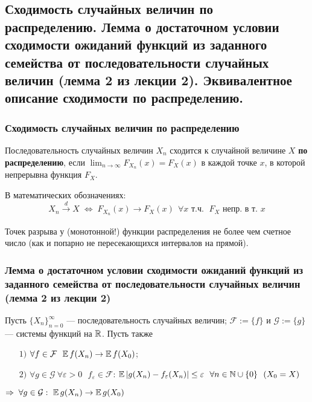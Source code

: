 \subsection{Сходимость случайных величин по распределению. Лемма о достаточном условии сходимости ожиданий функций из заданного семейства от последовательности случайных величин (лемма 2 из лекции 2). Эквивалентное описание сходимости по распределению.}

\subsubsection{Сходимость случайных величин по распределению}
\begin{definition*} Последовательность случайных величин $X_n$ сходится к случайной величине $X$ \textbf{по распределению}, если $\lim_{n \to \infty} F_{X_n}(x) = F_X(x)$ в каждой точке $x$, в которой непрерывна функция $F_X$. \end{definition*}
В математических обозначениях:
\[ X_n \xrightarrow[]{d} X \;\Leftrightarrow\; F_{X_n}(x) \to F_X(x) \ \ \forall x \text{ т.ч. } \; F_X \text{ непр. в т. } x \]

Точек разрыва у (монотонной!) функции распределения не более чем счетное число (как и попарно не пересекающихся интервалов на прямой).

\subsubsection{Лемма о достаточном условии сходимости ожиданий функций из заданного семейства от последовательности случайных величин (лемма 2 из лекции 2)}

\begin{lemma*}
    Пусть $\{X_n\}_{n=0}^{\infty}$ --- последовательность случайных величин; $\mathcal{F} := \{f\}$ и $\mathcal{G} := \{g\}$ --- системы функций на $\mathbb{R}$. Пусть также
    \begin{enumerate}
        \item[$1)$] $\forall f \in \mathcal{F} \ \ \mathbb{E}\,f(X_n) \to \mathbb{E}\,f(X_0)$;
        \item[$2)$] $\forall g \in \mathcal{G} \ \forall \varepsilon > 0 \ \ \ f_{\varepsilon} \in \mathcal{F}$: $\mathbb{E}\,|g(X_n) - f_{\varepsilon}(X_n)| \le \varepsilon \ \ \forall n \in \mathbb{N} \cup \{0\} 
        \ \ (X_0 = X)$
\end{enumerate}
$\Rightarrow\; \forall g \in \mathcal{G} : \ \mathbb{E}\,g(X_n) \to \mathbb{E}\,g(X_0)$
\end{lemma*}

